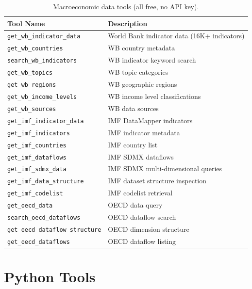 \begin{longtable}{p{5cm}p{8cm}}
\caption{Macroeconomic data tools (all free, no API key).} \label{tab:tools-macro} \\
\toprule
\textbf{Tool Name} & \textbf{Description} \\
\midrule
\endfirsthead
\texttt{get\_wb\_indicator\_data} & World Bank indicator data (16K+ indicators) \\
\texttt{get\_wb\_countries} & WB country metadata \\
\texttt{search\_wb\_indicators} & WB indicator keyword search \\
\texttt{get\_wb\_topics} & WB topic categories \\
\texttt{get\_wb\_regions} & WB geographic regions \\
\texttt{get\_wb\_income\_levels} & WB income level classifications \\
\texttt{get\_wb\_sources} & WB data sources \\
\texttt{get\_imf\_indicator\_data} & IMF DataMapper indicators \\
\texttt{get\_imf\_indicators} & IMF indicator metadata \\
\texttt{get\_imf\_countries} & IMF country list \\
\texttt{get\_imf\_dataflows} & IMF SDMX dataflows \\
\texttt{get\_imf\_sdmx\_data} & IMF SDMX multi-dimensional queries \\
\texttt{get\_imf\_data\_structure} & IMF dataset structure inspection \\
\texttt{get\_imf\_codelist} & IMF codelist retrieval \\
\texttt{get\_oecd\_data} & OECD data query \\
\texttt{search\_oecd\_dataflows} & OECD dataflow search \\
\texttt{get\_oecd\_dataflow\_structure} & OECD dimension structure \\
\texttt{get\_oecd\_dataflows} & OECD dataflow listing \\
\bottomrule
\end{longtable}

\section{Python Tools}
\label{sec:tools:python}

